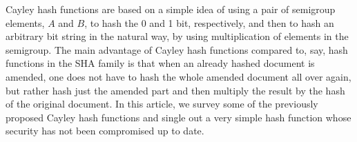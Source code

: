\documentclass{lmsedition}
\begin{document}


%


 
\begin{articlenoabs}
Cayley hash functions are based on a simple idea of using a pair of
semigroup elements,  $A$ and  $B$, to hash the 0 and 1 bit,
respectively, and  then to hash an arbitrary bit string in the
natural way, by using multiplication of elements in the semigroup. The main advantage of Cayley hash functions compared to, say, hash functions in the SHA family is that when an already hashed document is amended, one does not have to hash the whole amended document all over again, but rather hash just the amended part and then multiply the result by the hash of the original document. In this article, we survey some of the previously proposed Cayley hash functions and single out a very simple hash function whose security has not been compromised up to date. 
\end{articlenoabs}
\end{document}
